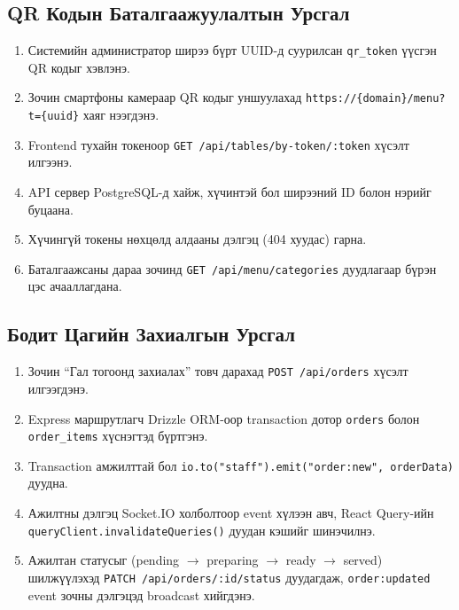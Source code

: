 \documentclass[12pt,a4paper]{article}
\begin{document}
\subsection{QR Кодын Баталгаажуулалтын Урсгал}

\begin{enumerate}[leftmargin=1.5cm]
  \item Системийн администратор ширээ бүрт UUID-д суурилсан
        \texttt{qr\_token} үүсгэн QR кодыг хэвлэнэ.
  \item Зочин смартфоны камераар QR кодыг уншуулахад
        \texttt{https://\{domain\}/menu?t=\{uuid\}} хаяг нээгдэнэ.
  \item Frontend тухайн токеноор \texttt{GET /api/tables/by-token/:token}
        хүсэлт илгээнэ.
  \item API сервер PostgreSQL-д хайж, хүчинтэй бол ширээний
        ID болон нэрийг буцаана.
  \item Хүчингүй токены нөхцөлд алдааны дэлгэц (404 хуудас) гарна.
  \item Баталгаажсаны дараа зочинд \texttt{GET /api/menu/categories}
        дуудлагаар бүрэн цэс ачааллагдана.
\end{enumerate}

\subsection{Бодит Цагийн Захиалгын Урсгал}

\begin{enumerate}[leftmargin=1.5cm]
  \item Зочин ``Гал тогоонд захиалах'' товч дарахад
        \texttt{POST /api/orders} хүсэлт илгээгдэнэ.
  \item Express маршрутлагч Drizzle ORM-оор transaction дотор
        \texttt{orders} болон \texttt{order\_items} хүснэгтэд
        бүртгэнэ.
  \item Transaction амжилттай бол
        \texttt{io.to("staff").emit("order:new", orderData)} дуудна.
  \item Ажилтны дэлгэц Socket.IO холболтоор event хүлээн авч,
        React Query-ийн \texttt{queryClient.invalidateQueries()}
        дуудан кэшийг шинэчилнэ.
  \item Ажилтан статусыг (pending $\to$ preparing $\to$ ready $\to$
        served) шилжүүлэхэд \texttt{PATCH /api/orders/:id/status}
        дуудагдаж, \texttt{order:updated} event зочны дэлгэцэд
        broadcast хийгдэнэ.
\end{enumerate}
\end{document}
